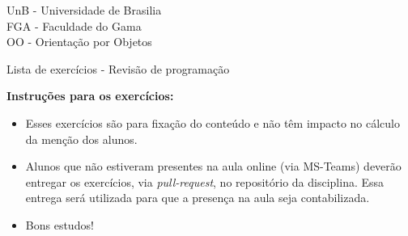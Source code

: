 \documentclass[a4paper, 12pt]{letter}
\begin{document}
UnB - Universidade de Brasilia \\
FGA - Faculdade do Gama \\
OO - Orientação por Objetos \\

\begin{center}
    \huge
    Lista de exercícios - Revisão de programação
    \normalsize
\end{center}

\begin{center}
    \textbf{Instruções para os exercícios:}
\end{center}

\begin{itemize}
  \item Esses exercícios são para fixação do conteúdo e não têm impacto no
    cálculo da menção dos alunos. 
  \item Alunos que não estiveram presentes na aula online (via MS-Teams) deverão
    entregar os exercícios, via \textit{pull-request}, no repositório da
    disciplina. Essa entrega será utilizada para que a presença na aula seja
    contabilizada. 
  \item Bons estudos!

\end{itemize}

\vspace{0.8cm}
\end{document}
